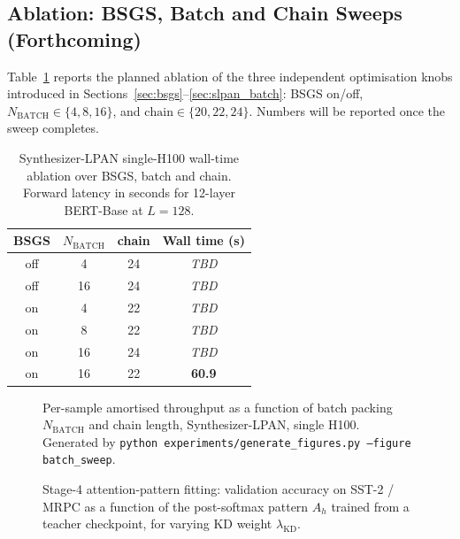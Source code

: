 \subsection{Ablation: BSGS, Batch and Chain Sweeps (Forthcoming)}

Table~\ref{tab:slpan_ablation} reports the planned ablation of the three independent optimisation knobs introduced in Sections~\ref{sec:bsgs}--\ref{sec:slpan_batch}: BSGS on/off, $N_{\mathrm{BATCH}} \in \{4, 8, 16\}$, and $\mathrm{chain} \in \{20, 22, 24\}$. Numbers will be reported once the sweep completes.

\begin{table}[htbp]
\centering
\caption{Synthesizer-LPAN single-H100 wall-time ablation over BSGS, batch and chain. Forward latency in seconds for 12-layer BERT-Base at $L = 128$.}
\label{tab:slpan_ablation}
\begin{tabular}{cccc}
\toprule
\textbf{BSGS} & \textbf{$N_{\mathrm{BATCH}}$} & \textbf{chain} & \textbf{Wall time (s)} \\
\midrule
off & 4  & 24 & \textit{TBD} \\
off & 16 & 24 & \textit{TBD} \\
on  & 4  & 22 & \textit{TBD} \\
on  & 8  & 22 & \textit{TBD} \\
on  & 16 & 24 & \textit{TBD} \\
on  & 16 & 22 & \textbf{60.9} \\
\bottomrule
\end{tabular}
\end{table}

\begin{figure}[htbp]
\centering
{}
\caption{Per-sample amortised throughput as a function of batch packing $N_{\mathrm{BATCH}}$ and chain length, Synthesizer-LPAN, single H100. Generated by \texttt{python experiments/generate\_figures.py --figure batch\_sweep}.}
\label{fig:slpan_batch_sweep}
\end{figure}

\begin{figure}[htbp]
\centering
{}
\caption{Stage-4 attention-pattern fitting: validation accuracy on SST-2 / MRPC as a function of the post-softmax pattern $A_h$ trained from a teacher checkpoint, for varying KD weight $\lambda_{\mathrm{KD}}$.}
\label{fig:slpan_kd_sweep}
\end{figure}
